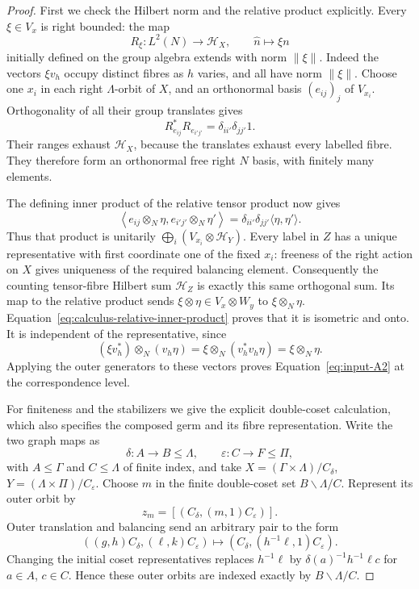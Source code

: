 \begin{proof}
First we check the Hilbert norm and the relative product explicitly.
Every $\xi\in V_x$ is right bounded: the map
\[
 R_\xi:L^2(N)\longrightarrow\mathcal H_X,
 \qquad \widehat n\longmapsto\xi n
\]
initially defined on the group algebra extends with norm $\|\xi\|$.
Indeed the vectors $\xi v_h$ occupy distinct fibres as $h$ varies,
and all have norm $\|\xi\|$.  Choose one $x_i$ in each right
$\Lambda$-orbit of $X$, and an orthonormal basis $(e_{ij})_j$ of
$V_{x_i}$.  Orthogonality of all their group translates gives
\[
 R_{e_{ij}}^*R_{e_{i'j'}}=\delta_{ii'}\delta_{jj'}1.
\]
Their ranges exhaust $\mathcal H_X$, because the translates exhaust
every labelled fibre.  They therefore form an orthonormal free
right $N$ basis, with finitely many elements.

The defining inner product of the relative tensor product now gives
\begin{equation}\label{eq:calculus-relative-inner-product}
 \left\langle e_{ij}\otimes_N\eta,
                 e_{i'j'}\otimes_N\eta'\right\rangle
 =\delta_{ii'}\delta_{jj'}\langle\eta,\eta'\rangle.
\end{equation}
Thus that product is unitarily
$\bigoplus_i(V_{x_i}\otimes\mathcal H_Y)$.
Every label in $Z$ has a unique representative with first coordinate
one of the fixed $x_i$: freeness of the right action on $X$ gives
uniqueness of the required balancing element.  Consequently the
counting tensor-fibre Hilbert sum $\mathcal H_Z$ is exactly this
same orthogonal sum.  Its map to the relative product sends
$\xi\otimes\eta\in V_x\otimes W_y$ to
$\xi\otimes_N\eta$.  Equation~\eqref{eq:calculus-relative-inner-product}
proves that it is isometric and onto.  It is independent of the
representative, since
\begin{equation}\label{eq:calculus-balanced-vector}
 (\xi v_h^*)\otimes_N(v_h\eta)
 =\xi\otimes_N(v_h^*v_h\eta)
 =\xi\otimes_N\eta.
\end{equation}
Applying the outer generators to these vectors proves
Equation~\eqref{eq:input-A2} at the correspondence level.

For finiteness and the stabilizers we give the explicit double-coset
calculation, which also specifies the composed germ and its fibre
representation.  Write the two graph maps as
\[
 \delta:A\longrightarrow B\leq\Lambda,
 \qquad \varepsilon:C\longrightarrow F\leq\Pi,
\]
with $A\leq\Gamma$ and $C\leq\Lambda$ of finite index, and
take $X=(\Gamma\times\Lambda)/C_\delta$,
$Y=(\Lambda\times\Pi)/C_\varepsilon$.
Choose $m$ in the finite double-coset set $B\backslash\Lambda/C$.
Represent its outer orbit by
\[
 z_m=[(C_\delta,(m,1)C_\varepsilon)].
\]
Outer translation and balancing send an arbitrary pair to the form
\[
 ((g,h)C_\delta,(\ell,k)C_\varepsilon)
 \longmapsto(C_\delta,(h^{-1}\ell,1)C_\varepsilon).
\]
Changing the initial coset representatives replaces $h^{-1}\ell$
by $\delta(a)^{-1}h^{-1}\ell c$ for $a\in A$, $c\in C$.
Hence these outer orbits are indexed exactly by
$B\backslash\Lambda/C$.


\end{proof}
